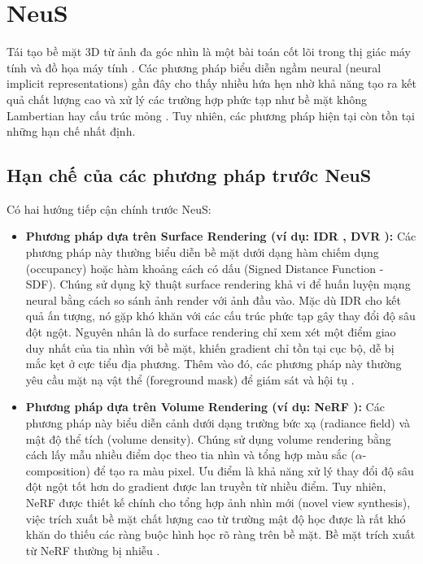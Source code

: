 \section{NeuS}
Tái tạo bề mặt 3D từ ảnh đa góc nhìn là một bài toán cốt lõi trong thị giác máy tính và đồ họa máy tính \cite{Wang2021NeuS}. Các phương pháp biểu diễn ngầm neural (neural implicit representations) gần đây cho thấy nhiều hứa hẹn nhờ khả năng tạo ra kết quả chất lượng cao và xử lý các trường hợp phức tạp như bề mặt không Lambertian hay cấu trúc mỏng \cite{Wang2021NeuS}. Tuy nhiên, các phương pháp hiện tại còn tồn tại những hạn chế nhất định.

\subsection{Hạn chế của các phương pháp trước NeuS}

Có hai hướng tiếp cận chính trước NeuS:

\begin{itemize}
    \item \textbf{Phương pháp dựa trên Surface Rendering (ví dụ: IDR \cite{Yariv2020IDR}, DVR \cite{Niemeyer2020DVR}):} Các phương pháp này thường biểu diễn bề mặt dưới dạng hàm chiếm dụng (occupancy) hoặc hàm khoảng cách có dấu (Signed Distance Function - SDF). Chúng sử dụng kỹ thuật surface rendering khả vi để huấn luyện mạng neural bằng cách so sánh ảnh render với ảnh đầu vào. Mặc dù IDR cho kết quả ấn tượng, nó gặp khó khăn với các cấu trúc phức tạp gây thay đổi độ sâu đột ngột. Nguyên nhân là do surface rendering chỉ xem xét một điểm giao duy nhất của tia nhìn với bề mặt, khiến gradient chỉ tồn tại cục bộ, dễ bị mắc kẹt ở cực tiểu địa phương. Thêm vào đó, các phương pháp này thường yêu cầu mặt nạ vật thể (foreground mask) để giám sát và hội tụ \cite{Wang2021NeuS}. %
    \item \textbf{Phương pháp dựa trên Volume Rendering (ví dụ: NeRF \cite{Mildenhall2020NeRF}):} Các phương pháp này biểu diễn cảnh dưới dạng trường bức xạ (radiance field) và mật độ thể tích (volume density). Chúng sử dụng volume rendering bằng cách lấy mẫu nhiều điểm dọc theo tia nhìn và tổng hợp màu sắc ($\alpha$-composition) để tạo ra màu pixel. Ưu điểm là khả năng xử lý thay đổi độ sâu đột ngột tốt hơn do gradient được lan truyền từ nhiều điểm. Tuy nhiên, NeRF được thiết kế chính cho tổng hợp ảnh nhìn mới (novel view synthesis), việc trích xuất bề mặt chất lượng cao từ trường mật độ học được là rất khó khăn do thiếu các ràng buộc hình học rõ ràng trên bề mặt. Bề mặt trích xuất từ NeRF thường bị nhiễu \cite{Wang2021NeuS}. %
\end{itemize}

